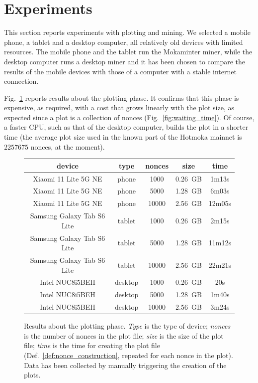 \section{Experiments}\label{sec:experiments}

This section reports experiments with plotting and mining.
We selected a mobile phone, a tablet and a desktop computer, all relatively old devices
with limited resources. The mobile phone and
the tablet run the Mokaminter miner, while the desktop computer runs a desktop miner and it has been
chosen to compare the results of the mobile devices with those of a
computer with a stable internet connection.

Fig.~\ref{fig:plotting_phase_experiments} reports results about the plotting phase.
It confirms that this phase is expensive, as required, with a cost that grows linearly with the
plot size, as expected since a plot is a collection of nonces
(Fig.~\ref{fig:waiting_time}). Of course, a faster CPU, such as that of the desktop computer,
builds the plot in a shorter time (the average plot size used in the known part of the Hotmoka
mainnet is $2257675$ nonces, at the moment).

\begin{figure}[t]
  \begin{center}
    \begin{tabular}{|c|c||c|c|c|}
      \hline
      \textbf{device} & \textbf{type} & \textbf{nonces} & \textbf{size} & \textbf{time} \\\hline\hline
      Xiaomi 11 Lite 5G NE & phone & 1000 & 0.26~GB & 1m13s \\\hline
      Xiaomi 11 Lite 5G NE & phone & 5000 & 1.28~GB & 6m03s \\\hline
      Xiaomi 11 Lite 5G NE & phone & 10000 & 2.56~GB & 12m05s \\\hline\hline
      Samsung Galaxy Tab S6 Lite & tablet & 1000 & 0.26~GB & 2m15s \\\hline
      Samsung Galaxy Tab S6 Lite & tablet & 5000 & 1.28~GB & 11m12s \\\hline
      Samsung Galaxy Tab S6 Lite & tablet & 10000 & 2.56~GB & 22m21s \\\hline\hline
      Intel NUC8i5BEH & desktop & 1000 & 0.26~GB & 20s \\\hline
      Intel NUC8i5BEH & desktop & 5000 & 1.28~GB & 1m40s \\\hline
      Intel NUC8i5BEH & desktop & 10000 & 2.56~GB & 3m24s \\\hline
    \end{tabular}
  \end{center}
  \caption{Results about the plotting phase. \emph{Type} is the type of device;
    \emph{nonces} is the number of nonces in the plot file;
    \emph{size} is the size of the plot file; \emph{time} is the time for creating the
    plot file (Def.~\ref{def:nonce_construction}, repeated for each nonce in the plot).
    Data has been collected by manually triggering the creation of the plots.
  }
  \label{fig:plotting_phase_experiments}
\end{figure}

